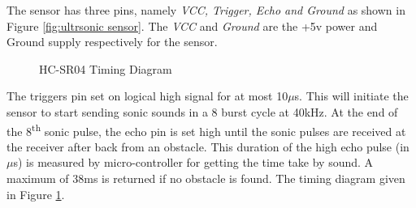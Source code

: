 \documentclass{article}
\begin{document}
The sensor has three pins, namely \emph{VCC, Trigger, Echo and Ground} as shown in Figure \ref{fig:ultrsonic sensor}. The \emph{VCC} and \emph{Ground} are the +5v power and Ground supply respectively for the sensor.

\begin{figure}[H]
    \centering
    \caption{HC-SR04 Timing Diagram}
    \label{fig:Timing Dig}
\end{figure}

The triggers pin set on logical high signal for at most 10\(\mu\)s. This will initiate the sensor to start sending sonic sounds in a 8 burst cycle at 40kHz. At the end of the 8\textsuperscript{th} sonic pulse, the echo pin is set high until the sonic pulses are received at the receiver after back from an obstacle. This duration of the high echo pulse (in \(\mu\)s) is measured by micro-controller for getting the time take by sound. A maximum of 38ms is returned if no obstacle is found. The timing diagram given in Figure \ref{fig:Timing Dig}.
\end{document}
